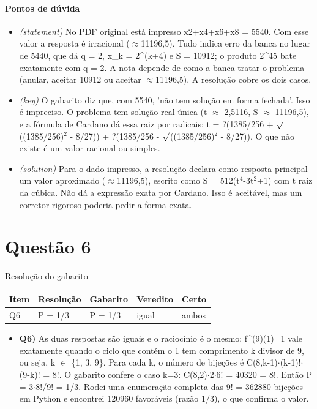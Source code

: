 \documentclass{article}%
\begin{document}
\paragraph{Pontos de dúvida}%
\begin{itemize}%
\item%
\textit{(statement)} No PDF original está impresso x2+x4+x6+x8 = 5540. Com esse valor a resposta é irracional ($\approx$11196,5). Tudo indica erro da banca no lugar de 5440, que dá q = 2, x\_k = 2\^{}(k+4) e S = 10912; o produto 2\^{}45 bate exatamente com q = 2. A nota depende de como a banca tratar o problema (anular, aceitar 10912 ou aceitar $\approx$11196,5). A resolução cobre os dois casos.%
\item%
\textit{(key)} O gabarito diz que, com 5540, 'não tem solução em forma fechada'. Isso é impreciso. O problema tem solução real única (t $\approx$ 2,5116, S $\approx$ 11196,5), e a fórmula de Cardano dá essa raiz por radicais: t = ?(1385/256 + $\surd$((1385/256)$^2$ - 8/27)) + ?(1385/256 - $\surd$((1385/256)$^2$ - 8/27)). O que não existe é um valor racional ou simples.%
\item%
\textit{(solution)} Para o dado impresso, a resolução declara como resposta principal um valor aproximado ($\approx$11196,5), escrito como S = 512(t$^{4}$-3t$^2$+1) com t raiz da cúbica. Não dá a expressão exata por Cardano. Isso é aceitável, mas um corretor rigoroso poderia pedir a forma exata.%
\end{itemize}%
\section*{Questão 6}%
\href{https://poliedroresolve.sistemapoliedro.com.br/vestibulares/ime/2027/ime-2-fase-dia-1-26-10-2026-2-fase-dia-1/dissertativa-6-matematica-2-fase-dia-1-ime-2027}{Resolução do gabarito}\par\smallskip%
\begin{longtable}{@{}p{} p{} p{} p{} p{}@{}}\toprule Item & Resolução & Gabarito & Veredito & Certo \\ \midrule
Q6 & P = 1/3 & P = 1/3 & igual & ambos \\
\bottomrule\end{longtable}%
\begin{itemize}%
\item%
\textbf{Q6)} As duas respostas são iguais e o raciocínio é o mesmo: f\^{}(9)(1)=1 vale exatamente quando o ciclo que contém o 1 tem comprimento k divisor de 9, ou seja, k $\in$ \{1, 3, 9\}. Para cada k, o número de bijeções é C(8,k-1)$\cdot$(k-1)!$\cdot$(9-k)! = 8!. O gabarito confere o caso k=3: C(8,2)$\cdot$2$\cdot$6! = 40320 = 8!. Então P = 3$\cdot$8!/9! = 1/3. Rodei uma enumeração completa das 9! = 362880 bijeções em Python e encontrei 120960 favoráveis (razão 1/3), o que confirma o valor.%
\end{itemize}%
\end{document}
